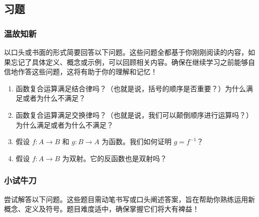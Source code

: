 
\subsection{习题}\label{sec:section7.5.4}

\subsubsection*{温故知新}

以口头或书面的形式简要回答以下问题。这些问题全都基于你刚刚阅读的内容，如果忘记了具体定义、概念或示例，可以回顾相关内容。确保在继续学习之前能够自信地作答这些问题，这将有助于你的理解和记忆！

\begin{enumerate}[label=(\arabic*)]
    \item 函数复合运算满足结合律吗？（也就是说，括号的顺序是否重要？）为什么满足或者为什么不满足？
    \item 函数复合运算满足交换律吗？（也就是说，我们可以颠倒顺序进行运算吗？）为什么满足或者为什么不满足？
    \item 假设 $f : A \to B$ 和 $g : B \to A$ 为函数。我们如何证明 $g = f^{-1}$？
    \item 假设 $f : A \to B$ 为双射。它的反函数也是双射吗？
\end{enumerate}

\subsubsection*{小试牛刀}

尝试解答以下问题。这些题目需动笔书写或口头阐述答案，旨在帮助你熟练运用新概念、定义及符号。题目难度适中，确保掌握它们将大有裨益！

